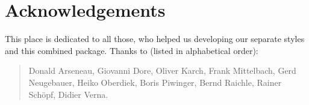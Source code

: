 \section{Acknowledgements}

This place is dedicated to all those, who helped us developing
our separate styles and this combined package. Thanks to
(listed in alphabetical order):
\begin{quote}
 Donald Arseneau,
 Giovanni Dore,
 Oliver Karch,
 Frank Mittelbach, 
 Gerd Neugebauer, 
 Heiko Oberdiek,
 Boris Piwinger,
 Bernd Raichle,
 Rainer Sch\"opf,
 Didier Verna.
\end{quote}

\endinput
